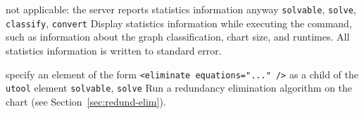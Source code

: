 \begin{itemize}
{not applicable: the server reports statistics information anyway}
{\texttt{solvable}, \texttt{solve}, \texttt{classify}, \texttt{convert}}
{Display statistics information while executing the command, such as
information about the graph classification, chart size, and
runtimes. All statistics information is written to standard error.}


{specify an element of the form \texttt{<eliminate equations="..." />}
as a child of the \texttt{utool} element}
{\texttt{solvable}, \texttt{solve}}
{Run a redundancy elimination algorithm on the chart (see  Section~\ref{sec:redund-elim}).} 
\end{itemize}




